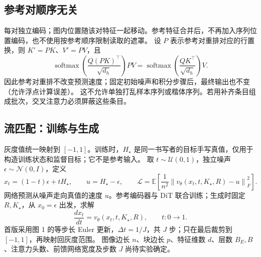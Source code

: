 \documentclass[UTF8,fontset=fandol,zihao=5,a4paper]{ctexart}
\begin{document}
\newpage
\subsection{参考对顺序无关}
每对独立编码；图内位置随该对特征一起移动。参考特征合并后，不再加入序列位置编码，也不使用按参考顺序限制读取的遮罩。
设 $P$ 表示参考对重排对应的行置换，则 $K'=PK$、$V'=PV$，且
\[
 \operatorname{softmax}\!\left(\frac{Q(PK)^\top}{\sqrt{d_h}}\right)PV
 =\operatorname{softmax}\!\left(\frac{QK^\top}{\sqrt{d_h}}\right)V.
\]
因此参考对重排不改变预测速度；固定初始噪声和积分步骤后，最终输出也不变（允许浮点计算误差）。
这不允许单独打乱样本序列或楷体序列。若用补齐条目组成批次，交叉注意力必须屏蔽这些条目。

\subsection{流匹配：训练与生成}
灰度值统一映射到 $[-1,1]$。训练时，$H_\star$ 是同一书写者的目标手写真值，仅用于构造训练状态和监督目标；它不是参考输入。
取 $t\sim\mathcal U(0,1)$，独立噪声 $\epsilon\sim\mathcal N(0,I)$，定义
\[
 x_t=(1-t)\epsilon+tH_\star,\qquad
 u=H_\star-\epsilon,\qquad
 \mathcal L=\mathbb E\!\left[\frac{1}{n^2}\left\|v_\theta(x_t,t,K_\star,R)-u\right\|_F^2\right].
\]
网络预测从噪声走向真值的速度 $u$。参考编码器与 DiT 联合训练；生成时固定 $R,K_\star$，从 $x_0=\epsilon$ 出发，求解
\[
 \frac{dx_t}{dt}=v_\theta(x_t,t,K_\star,R),\qquad t:0\longrightarrow1.
\]
首版采用图 1 的等步长 Euler 更新，$\Delta t=1/J$，共 $J$ 步；只在最后裁剪到 $[-1,1]$，再映射回灰度范围。
图像边长 $n$、块边长 $p$、特征维数 $d$、层数 $B_E,B$、注意力头数、前馈网络宽度及步数 $J$ 尚待实验确定。
\end{document}
